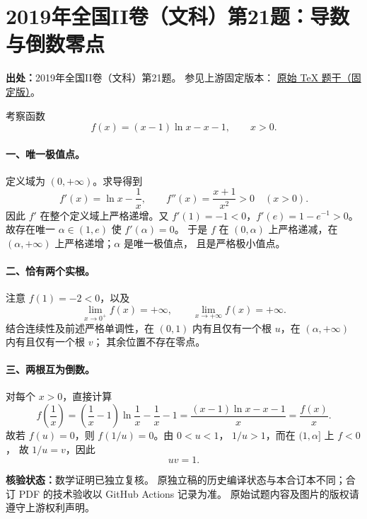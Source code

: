 \documentclass[UTF8,a4paper,11pt]{ctexart}
\begin{document}
\section*{2019年全国II卷（文科）第21题：导数与倒数零点}
\noindent\textbf{出处：}2019年全国II卷（文科）第21题。
参见上游固定版本：
\href{https://github.com/DxAThing/Gaokao-Math-Problems-Compilation/blob/f1ae169b58a75b3db6e35c670b3f0d5c78718188/content/2019/national_paper_2_liberal.tex#L418}{原始 TeX 题干（固定版）}。

\medskip
考察函数
\[
  f(x)=(x-1)\ln x-x-1,\qquad x>0.
\]

\paragraph{一、唯一极值点。}
定义域为 $(0,+\infty)$。求导得到
\[
 f'(x)=\ln x-\frac1x,\qquad
 f''(x)=\frac{x+1}{x^2}>0 \quad(x>0).
\]
因此 $f'$ 在整个定义域上严格递增。又
$f'(1)=-1<0$，$f'(e)=1-e^{-1}>0$。
故存在唯一 $\alpha\in(1,e)$ 使 $f'(\alpha)=0$。
于是 $f$ 在 $(0,\alpha)$ 上严格递减，在
$(\alpha,+\infty)$ 上严格递增；$\alpha$ 是唯一极值点，
且是严格极小值点。

\paragraph{二、恰有两个实根。}
注意 $f(1)=-2<0$，以及
\[
 \lim_{x\to0^+}f(x)=+\infty,
 \qquad \lim_{x\to+\infty}f(x)=+\infty.
\]
结合连续性及前述严格单调性，在 $(0,1)$ 内有且仅有一个根
$u$，在 $(\alpha,+\infty)$ 内有且仅有一个根 $v$；
其余位置不存在零点。

\paragraph{三、两根互为倒数。}
对每个 $x>0$，直接计算
\[
 f\!\left(\frac1x\right)
 =\left(\frac1x-1\right)\ln\frac1x-\frac1x-1
 =\frac{(x-1)\ln x-x-1}{x}
 =\frac{f(x)}{x}.
\]
故若 $f(u)=0$，则 $f(1/u)=0$。由 $0<u<1$，
$1/u>1$，而在 $(1,\alpha]$ 上 $f<0$，
故 $1/u=v$，因此
\[
 \boxed{uv=1}.
\]

\bigskip
\noindent\textbf{核验状态：}数学证明已独立复核。
原独立稿的历史编译状态与本合订本不同；合订 PDF 的技术验收以 GitHub Actions 记录为准。
原始试题内容及图片的版权请遵守上游权利声明。

\clearpage
{}
{}
\end{document}
